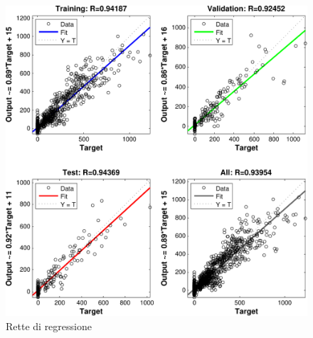 \begin{figure}
  \centering
  \includegraphics[scale=0.7]{images/neural_net/regressions.pdf}
  \caption{Rette di regressione}
\end{figure}

\clearpage
